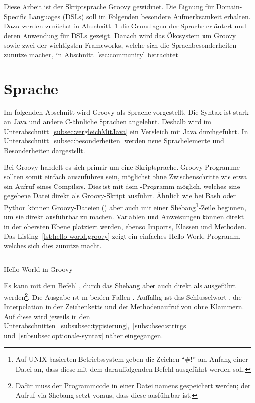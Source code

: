 \documentclass[a4paper]{article}
\newcommand{\codelisting}[3]{
\begin{listing}[ht]
	\inputminted{#1}{#1/#2}
	\vspace{-3ex}
	\caption{#3}
	\label{lst:#2}
\end{listing}
}
\begin{document}
Diese Arbeit ist der Skriptsprache Groovy gewidmet.
Die Eignung für Domain-Specific Languages (DSLs) soll im Folgenden besondere Aufmerksamkeit erhalten.
Dazu werden zunächst in Abschnitt~\ref{sec:sprache} die Grundlagen der Sprache erläutert und deren Anwendung für DSLs gezeigt.
Danach wird das Ökosystem um Groovy sowie zwei der wichtigsten Frameworks, welche sich die Sprachbesonderheiten zunutze machen, in Abschnitt~\ref{sec:community} betrachtet.


\section{Sprache}\label{sec:sprache}

Im folgenden Abschnitt wird Groovy als Sprache vorgestellt.
Die Syntax ist stark an Java und andere C-ähnliche Sprachen angelehnt.
Deshalb wird im Unterabschnitt~\ref{subsec:vergleichMitJava} ein Vergleich mit Java durchgeführt.
In Unterabschnitt~\ref{subsec:besonderheiten} werden neue Sprachelemente und Besonderheiten dargestellt.

Bei Groovy handelt es sich primär um eine Skriptsprache.
Groovy-Programme sollten somit einfach auszuführen sein, möglichst ohne Zwischenschritte wie etwa ein Aufruf eines Compilers.
Dies ist mit dem -Programm möglich, welches eine gegebene Datei direkt als Groovy-Skript ausführt.
Ähnlich wie bei Bash oder Python können Groovy-Dateien () aber auch mit einer Shebang\footnote{Auf UNIX-basierten Betriebssystem geben die Zeichen ``\#!'' am Anfang einer Datei an, dass diese mit dem darauffolgenden Befehl ausgeführt werden soll.}-Zeile beginnen, um sie direkt ausführbar zu machen.
Variablen und Anweisungen können direkt in der obersten Ebene platziert werden, ebenso Imports, Klassen und Methoden.
Das Listing~\ref{lst:hello-world.groovy} zeigt ein einfaches Hello-World-Programm, welches sich dies zunutze macht.

\codelisting{groovy}{hello-world.groovy}{Hello World in Groovy}

Es kann mit dem Befehl , durch das Shebang aber auch direkt als  ausgeführt werden\footnote{Dafür muss der Programmcode in einer Datei namens  gespeichert werden; der Aufruf via Shebang setzt voraus, dass diese ausführbar ist.}.
Die Ausgabe ist in beiden Fällen .
Auffällig ist das Schlüsselwort , die Interpolation in der Zeichenkette und der Methodenaufruf von  ohne Klammern.
Auf diese wird jeweils in den Unterabschnitten~\ref{subsubsec:typisierung},~\ref{subsubsec:strings} und~\ref{subsubsec:optionale-syntax} näher eingegangen.
\end{document}

